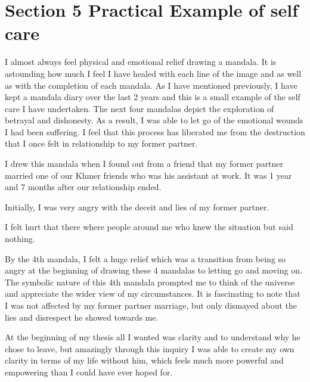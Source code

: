 \chapter{Section 5
Practical Example of self care}


I almost always feel physical and emotional relief drawing a mandala. It is astounding how much I feel I have healed with each line of the image and as well as with the completion of each mandala. As I have mentioned previously, I have kept a mandala diary over the last 2 years and this is a small example of the self care I have undertaken. The next four mandalas depict the exploration of betrayal and dishonesty. As a result, I was able to let go of the emotional wounds I had been suffering. I feel that this process has liberated me from the destruction that I once felt in relationship to my former partner. 




I drew this mandala when I found out from a friend that my former partner married one of our Khmer friends who was his assistant at work. It was 1 year and 7 months after our relationship ended. 



Initially, I was very angry with the deceit and lies of my former partner. 


I felt hurt that there where people around me who knew the situation but said nothing. 



By the 4th mandala, I felt a huge relief which was a transition from being so angry at the beginning of drawing these 4 mandalas to letting go and moving on. The symbolic nature of this 4th mandala prompted me to think of the universe and appreciate the wider view of my circumstances. It is fascinating to note that I was not affected by my former partner marriage, but only dismayed about the lies and disrespect he showed towards me. 

At the beginning of my thesis all I wanted was clarity and to understand why he chose to leave, but amazingly through this inquiry I was able to create my own clarity in terms of my life without him, which feels much more powerful and empowering than I could have ever hoped for. 



